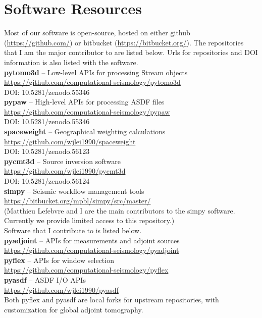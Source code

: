 \chapter{Software Resources\label{ch:implementation}}
\label{ch:software_resource}

Most of our software is open-source, hosted on either github (\url{https://github.com/}) or bitbucket (\url{https://bitbucket.org/}).
The repositories that I am the major contributor to are listed below. Urls for
repositories and DOI information is also listed with the software.\\

\noindent \textbf{pytomo3d} -- Low-level APIs for processing Stream objects\\
\url{https://github.com/computational-seismology/pytomo3d}\\
DOI: 10.5281/zenodo.55346\\

\noindent \textbf{pypaw} -- High-level APIs for processing ASDF files\\
\url{https://github.com/computational-seismology/pypaw}\\
DOI: 10.5281/zenodo.55346\\

\noindent \textbf{spaceweight} -- Geographical weighting calculations\\
\url{https://github.com/wjlei1990/spaceweight}\\
DOI: 10.5281/zenodo.56123\\

\noindent \textbf{pycmt3d} -- Source inversion software\\
\url{https://github.com/wjlei1990/pycmt3d}\\
DOI: 10.5281/zenodo.56124\\

\noindent \textbf{simpy} -- Seismic workflow management tools\\
\url{https://bitbucket.org/mpbl/simpy/src/master/}\\
(Matthieu Lefebvre and I are the main contributors to the simpy software.
Currently we provide limited access to this repository.)\\

Software that I contribute to is listed below.\\

\noindent \textbf{pyadjoint} -- APIs for measurements and adjoint sources\\
\url{https://github.com/computational-seismology/pyadjoint}\\

\noindent \textbf{pyflex} -- APIs for window selection\\
\url{https://github.com/computational-seismology/pyflex}\\

\noindent \textbf{pyasdf} -- ASDF I/O APIs\\
\url{https://github.com/wjlei1990/pyasdf}\\

Both pyflex and pyasdf are local forks for upstream repositories,
with customization for global adjoint tomography.
